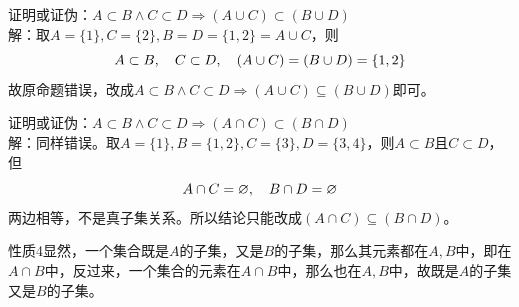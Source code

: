 \documentclass[lang=cn,11pt]{elegantbook}
\begin{document}
证明或证伪：$A\subset B\land C\subset D\Rightarrow (A\cup C)\subset (B\cup D)$\\
解：取$A=\{1\},C=\{2\},B=D=\{1,2\}=A\cup C$，则
\vspace{-10pt}\[A\subset B,\quad C\subset D,\quad (A\cup C)=(B\cup D)=\{1,2\}\vspace{-10pt}\]故原命题错误，改成$A\subset B\land C\subset D\Rightarrow (A\cup C)\subseteq (B\cup D)$即可。

证明或证伪：$A\subset B\land C\subset D\Rightarrow (A\cap C)\subset (B\cap D)$\\
解：同样错误。取$A=\{1\},B=\{1,2\},C=\{3\},D=\{3,4\}$，则$A\subset B$且$C\subset D$，但
\vspace{-10pt}\[A\cap C=\varnothing,\quad B\cap D=\varnothing\vspace{-10pt}\]
两边相等，不是真子集关系。所以结论只能改成$(A\cap C)\subseteq (B\cap D)$。

性质4显然，一个集合既是$A$的子集，又是$B$的子集，那么其元素都在$A,B$中，即在$A\cap B$中，反过来，一个集合的元素在$A\cap B$中，那么也在$A,B$中，故既是$A$的子集又是$B$的子集。
\end{document}
